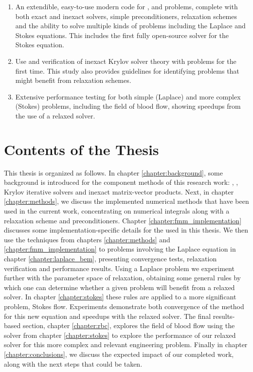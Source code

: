 \begin{enumerate}
\item An extendible, easy-to-use modern code for {\fmm}, {\bem} and {\fmmbem} problems, complete with both exact and inexact solvers, simple preconditioners, relaxation schemes and the ability to solve multiple kinds of problems including the Laplace and Stokes equations. This includes the first fully open-source {\fmmbem} solver for the Stokes equation.

\item Use and verification of inexact Krylov solver theory with {\fmmbem} problems for the first time. This study also provides guidelines for identifying problems that might benefit from relaxation schemes. %

\item Extensive performance testing for both simple (Laplace) and more complex (Stokes) {\bem} problems, including the field of blood flow, showing speedups from the use of a relaxed solver.

\end{enumerate}

\section{Contents of the Thesis}\label{sec:contents_of_thesis}

This thesis is organized as follows. In chapter \ref{chapter:background}, some background is introduced for the component methods of this research work: {\bem}, {\fmm}, Krylov iterative solvers and inexact matrix-vector products. Next, in chapter \ref{chapter:methods}, we discuss the implemented numerical methods that have been used in the current work, concentrating on numerical integrals along with a relaxation scheme and preconditioners. Chapter \ref{chapter:fmm_implementation} discusses some implementation-specific details for the {\fmm} used in this thesis. We then use the techniques from chapters \ref{chapter:methods} and \ref{chapter:fmm_implementation} to problems involving the Laplace equation in chapter \ref{chapter:laplace_bem}, presenting convergence tests, relaxation verification and performance results. Using a Laplace problem we experiment further with the parameter space of relaxation, obtaining some general rules by which one can determine whether a given problem will benefit from a relaxed solver. In chapter \ref{chapter:stokes} these rules are applied to a more significant problem, Stokes flow. Experiments demonstrate both convergence of the method for this new equation and speedups with the relaxed solver. The final results-based section, chapter \ref{chapter:rbc}, explores the field of blood flow using the solver from chapter \ref{chapter:stokes} to explore the performance of our relaxed solver for this more complex and relevant engineering problem. Finally in chapter \ref{chapter:conclusions}, we discuss the expected impact of our completed work, along with the next steps that could be taken.

